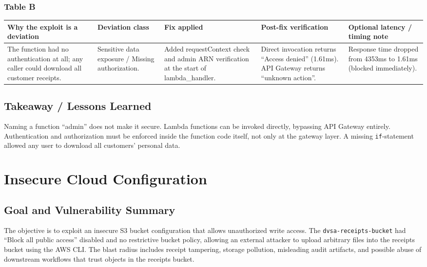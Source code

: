 \documentclass[12pt]{report}
\begin{document}
\subsection*{Table B}
\begin{table}[H]
  \footnotesize
  \centering
  \begin{tabularx}{\textwidth}{|Y|Y|Y|Y|Y|}
    \hline
    \textbf{Why the exploit is a deviation} & \textbf{Deviation class} & \textbf{Fix applied} & \textbf{Post-fix verification} & \textbf{Optional latency / timing note} \\
    \hline
    The function had no authentication at all; any caller could download all customer receipts. &
    Sensitive data exposure / Missing authorization. &
    Added requestContext check and admin ARN verification at the start of lambda\_handler. &
    Direct invocation returns ``Access denied'' (1.61ms). API Gateway returns ``unknown action''. &
    Response time dropped from 4353ms to 1.61ms (blocked immediately). \\
    \hline
  \end{tabularx}
\end{table}

\section{Takeaway / Lessons Learned}
Naming a function ``admin'' does not make it secure. Lambda functions can be invoked directly, bypassing API Gateway entirely. Authentication and authorization must be enforced inside the function code itself, not only at the gateway layer. A missing \texttt{if}-statement allowed any user to download all customers' personal data.

\clearpage

\chapter{Insecure Cloud Configuration}

\section{Goal and Vulnerability Summary}
The objective is to exploit an insecure S3 bucket configuration that allows unauthorized write access. The \texttt{dvsa-receipts-bucket} had ``Block all public access'' disabled and no restrictive bucket policy, allowing an external attacker to upload arbitrary files into the receipts bucket using the AWS CLI. The blast radius includes receipt tampering, storage pollution, misleading audit artifacts, and possible abuse of downstream workflows that trust objects in the receipts bucket.
\end{document}
